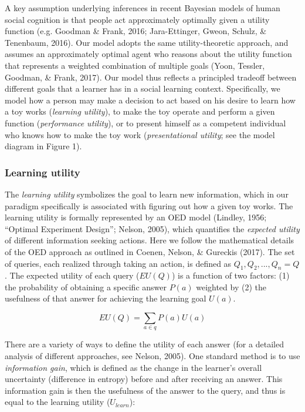 \documentclass[10pt, letterpaper]{article}
\begin{document}
A key assumption underlying inferences in recent Bayesian models of
human social cognition is that people act approximately optimally given
a utility function (e.g. Goodman \& Frank, 2016; Jara-Ettinger, Gweon,
Schulz, \& Tenenbaum, 2016). Our model adopts the same utility-theoretic
approach, and assumes an approximately optimal agent who reasons about
the utility function that represents a weighted combination of multiple
goals (Yoon, Tessler, Goodman, \& Frank, 2017). Our model thus reflects
a principled tradeoff between different goals that a learner has in a
social learning context. Specifically, we model how a person may make a
decision to act based on his desire to learn how a toy works
(\emph{learning utility}), to make the toy operate and perform a given
function (\emph{performance utility}), or to present himself as a
competent individual who knows how to make the toy work
(\emph{presentational utility}; see the model diagram in Figure 1).

\subsubsection{Learning utility}\label{learning-utility}

The \emph{learning utility} symbolizes the goal to learn new
information, which in our paradigm specifically is associated with
figuring out how a given toy works. The learning utility is formally
represented by an OED model (Lindley, 1956; ``Optimal Experiment
Design''; Nelson, 2005), which quantifies the \emph{expected utility} of
different information seeking actions. Here we follow the mathematical
details of the OED approach as outlined in Coenen, Nelson, \& Gureckis
(2017). The set of queries, each realized through taking an action, is
defined as \(Q_1, Q_2, ..., Q_n = {Q}\). The expected utility of each
query (\(EU(Q)\)) is a function of two factors: (1) the probability of
obtaining a specific answer \(P(a)\) weighted by (2) the usefulness of
that answer for achieving the learning goal \(U(a)\).

\[EU(Q) = \sum_{a\in q}{P(a)U(a)}\]

There are a variety of ways to define the utility of each answer (for a
detailed analysis of different approaches, see Nelson, 2005). One
standard method is to use \emph{information gain}, which is defined as
the change in the learner's overall uncertainty (difference in entropy)
before and after receiving an answer. This information gain is then the
usefulness of the answer to the query, and thus is equal to the learning
utility (\(U_{learn}\)):
\end{document}
